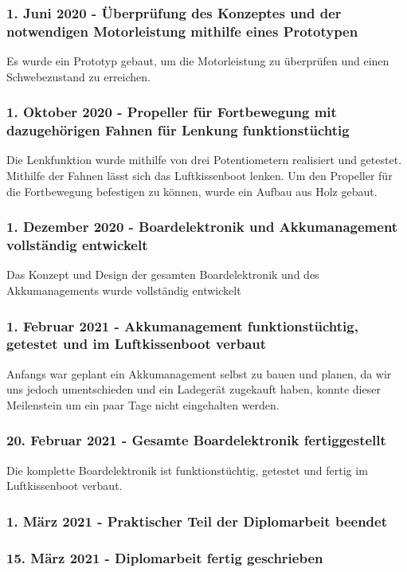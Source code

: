 \subsubsection*{1. Juni 2020 - Überprüfung des Konzeptes und der notwendigen Motorleistung mithilfe eines Prototypen}
Es wurde ein Prototyp gebaut, um die Motorleistung zu überprüfen und einen Schwebezustand zu erreichen.

\subsubsection*{1. Oktober 2020 - Propeller für Fortbewegung mit dazugehörigen Fahnen für Lenkung funktionstüchtig}
Die Lenkfunktion wurde mithilfe von drei Potentiometern realisiert und getestet. Mithilfe der Fahnen lässt sich das Luftkissenboot lenken. Um den Propeller für 
die Fortbewegung befestigen zu können, wurde ein Aufbau aus Holz gebaut.

\subsubsection*{1. Dezember 2020 - Boardelektronik und  Akkumanagement vollständig entwickelt}
Das Konzept und Design der gesamten Boardelektronik und des Akkumanagements wurde  vollständig entwickelt
\subsubsection*{1. Februar 2021 - Akkumanagement funktionstüchtig, getestet und im Luftkissenboot verbaut}
Anfangs war geplant ein Akkumanagement selbst zu bauen und planen, da wir uns jedoch umentschieden und ein Ladegerät zugekauft haben, konnte dieser Meilenstein um ein paar Tage 
nicht eingehalten werden. 
\subsubsection*{20. Februar 2021 - Gesamte Boardelektronik fertiggestellt}
Die komplette Boardelektronik ist funktionstüchtig, getestet und fertig im Luftkissenboot verbaut. 

\subsubsection*{1. März 2021 - Praktischer Teil der Diplomarbeit beendet}

\subsubsection*{15. März 2021 - Diplomarbeit fertig geschrieben}
